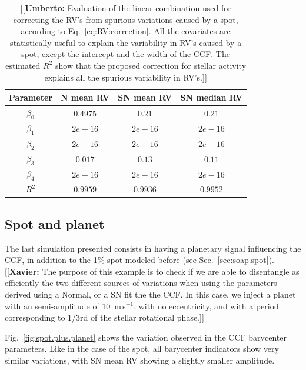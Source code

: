 \documentclass{aa}
\def\ms{\hbox{\,m\,s$^{-1}$}}         %
\newcommand{\xavier}[1]{{\color{blue}[[\textbf{Xavier: }#1]]}}
\newcommand{\umberto}[1]{{\color{green}[[\textbf{Umberto: }#1]]}}
\begin{document}
\begin{table}
\centering
\begin{tabular}{|c|c|c|c|}
\hline
Parameter          & N mean RV         &   SN mean RV &   SN median RV \\
\hline
$\beta_{0}$            &    $0.4975$    & $0.21$ & $0.21$ \\
\hline
$\beta_{1}$            &    $2e-16$    & $2e-16$ & $2e-16$ \\
\hline
$\beta_{2}$            &     $2e-16$   &  $2e-16$ & $2e-16$\\
\hline
$\beta_{3}$            &     $0.017$   &  $0.13$ & $0.11$\\
\hline
$\beta_{4}$            &     $2e-16$   &  $2e-16$ & $2e-16$\\
\hline
$R^{2}$      &     $0.9959$    &  $0.9936$ & $0.9952$  \\
\hline
\end{tabular}
\caption{\umberto{Evaluation of the linear combination used for correcting the RV's from spurious variations caused by a spot, according to Eq.~\ref{eq:RV:correction}. All the covariates are statistically useful to explain the variability in RV's caused by a spot, except the intercept and the width of the CCF. The estimated $R^{2}$ show that the proposed correction for stellar activity explains all the spurious variability in RV's.}}
\label{table:spot.test}
\end{table}

\subsection{Spot and planet} \label{sec:soap.spot.planet}

The last simulation presented consists in having a planetary signal influencing the CCF, in addition to the 1\% spot modeled before (see Sec.~\ref{sec:soap.spot}). \xavier{The purpose of this example is to check if we are able to disentangle as efficiently the two different sources of variations when using the parameters derived using a Normal, or a SN fit the the CCF. In this case, we inject a planet with an semi-amplitude of 10 \ms, with no eccentricity, and with a period corresponding to 1/3rd of the stellar rotational phase.}

Fig.~\ref{fig:spot.plus.planet} shows the variation observed in the CCF barycenter parameters. Like in the case of the spot, all barycenter indicators show very similar variations, with SN mean RV showing a slightly smaller amplitude.
\end{document}
